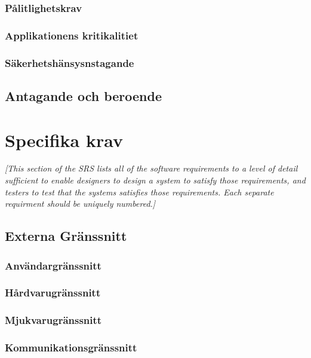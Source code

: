 \documentclass{article}
\begin{document}
\begin{enumerate}
\subsubsection{Pålitlighetskrav}
\label{subsec:Palitlighetskrav}
\subsubsection{Applikationens kritikalitiet}
\label{subsec:Applikationens kritikalitiet}
\subsubsection{Säkerhetshänsysnstagande}
\label{subsec:Sakerhetshansysnstagande}

\subsection{Antagande och beroende}
\label{subsec:Antagande och beroende}

\section{Specifika krav}
\label{sec:Specifika krav}
\emph{[This section of the \ac{SRS} lists all of the software requirements to
  a level of detail sufficient to enable designers to design a system to
  satisfy those requirements, and testers to test that the systems satisfies
  those requirements. Each separate requirment should be uniquely numbered.]}

\subsection{Externa Gränssnitt}
\label{subsec:Externa Granssnitt}
\subsubsection{Användargränssnitt}
\label{subsec:EG-Anvandargranssnitt}
\subsubsection{Hårdvarugränssnitt}
\label{subsec:EG-Hardvarugranssnitt}
\subsubsection{Mjukvarugränssnitt}
\label{subsec:EG-Mjukvarugranssnitt}
\subsubsection{Kommunikationsgränssnitt}
\label{subsec:EG-Kommunikationsgranssnitt}

\end{enumerate}
\end{document}

